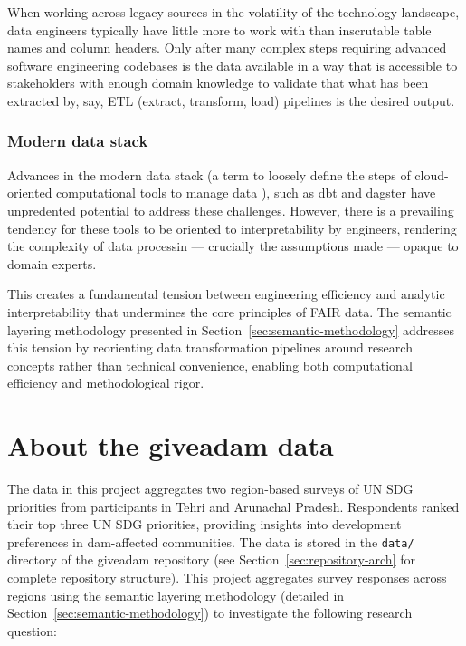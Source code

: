 \documentclass{article}
\begin{document}
When working across legacy sources in the volatility of the technology landscape, data engineers typically have little more to work with than inscrutable table names and column headers. Only after many complex steps requiring advanced software engineering codebases is the data available in a way that is accessible to stakeholders with enough domain knowledge to validate that what has been extracted by, say, ETL (extract, transform, load) pipelines is the desired output. 

\subsubsection{Modern data stack}

Advances in the modern data stack (a term to loosely define the steps of cloud-oriented computational tools to manage data \cite{modern_data_stack_airbyte}), such as dbt \cite{dbt_core} and dagster \cite{dagster} have unpredented potential to address these challenges. However, there is a prevailing tendency for these tools to be oriented to interpretability by engineers, rendering the complexity of data processin --- crucially the assumptions made --- opaque to domain experts. 

This creates a fundamental tension between engineering efficiency and analytic interpretability that undermines the core principles of FAIR data. The semantic layering methodology presented in Section~\ref{sec:semantic-methodology} addresses this tension by reorienting data transformation pipelines around research concepts rather than technical convenience, enabling both computational efficiency and methodological rigor.




\section{About the giveadam data}
\label{sec:aboutdata}

The data in this project aggregates two region-based surveys of UN SDG priorities from participants in Tehri and Arunachal Pradesh. Respondents ranked their top three UN SDG priorities, providing insights into development preferences in dam-affected communities. The data is stored in the \texttt{data/} directory of the giveadam repository (see Section~\ref{sec:repository-arch} for complete repository structure). This project aggregates survey responses across regions using the semantic layering methodology (detailed in Section~\ref{sec:semantic-methodology}) to investigate the following research question:
\end{document}
